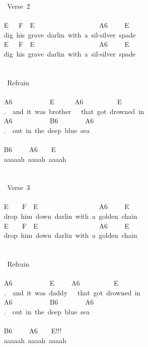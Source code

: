 {\lbrack\ Verse\ 2\rbrack\\
\\
E\ \ \ F\ \ E\ \ \ \ \ \ \ \ \ \ \ \ \ \ \ \ \ \ \ A6\ \ \ \ \ E\\
dig\ his\ grave\ darlin\ with\ a\ sil-silver\ spade\\
E\ \ \ F\ \ E\ \ \ \ \ \ \ \ \ \ \ \ \ \ \ \ \ \ \ A6\ \ \ \ \ E\\
dig\ his\ grave\ darlin\ with\ a\ sil-silver\ spade\\
\\
\\
\lbrack\ Refrain\rbrack\\
\\
A6\ \ \ \ \ \ \ \ \ \ \ E\ \ \ \ \ \ A6\ \ \ \ \ \ \ \ \ \ E\\
.\ \ and\ it\ was\ brother\ \ \ that\ got\ drowned\ in\\
A6\ \ \ \ \ \ \ \ \ \ \ B6\ \ \ \ \ \ \ \ A6\\
.\ \ out\ in\ the\ deep\ blue\ sea\\
\\
B6\ \ \ \ \ A6\ \ \ \ E\\
aaaaah\ aaaah\ aaaah\\
\\
\\
\lbrack\ Verse\ 3\rbrack\\
\\
E\ \ \ \ F\ \ E\ \ \ \ \ \ \ \ \ \ \ \ \ \ \ \ \ \ A6\ \ \ \ \ E\\
drop\ him\ down\ darlin\ with\ a\ golden\ chain\\
E\ \ \ \ F\ \ E\ \ \ \ \ \ \ \ \ \ \ \ \ \ \ \ \ \ A6\ \ \ \ \ E\\
drop\ him\ down\ darlin\ with\ a\ golden\ chain\\
\\
\\
\lbrack\ Refrain\rbrack\\
\\
A6\ \ \ \ \ \ \ \ \ \ \ E\ \ \ \ \ A6\ \ \ \ \ \ \ \ \ \ E\\
.\ \ and\ it\ was\ daddy\ \ \ that\ got\ drowned\ in\\
A6\ \ \ \ \ \ \ \ \ \ \ B6\ \ \ \ \ \ \ \ A6\\
.\ \ out\ in\ the\ deep\ blue\ sea\\
\\
B6\ \ \ \ \ A6\ \ \ \ E!!!\\
aaaaah\ aaaah\ aaaah\\
\\
}
